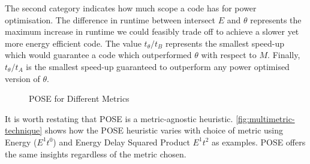 The second category indicates how much scope a code has for power optimisation.
The difference in runtime between intersect $E$ and $\theta$ represents the maximum increase in runtime we could feasibly trade off to achieve a slower yet more energy efficient code.
The value $t_\theta / t_B$ represents the smallest speed-up which would guarantee a code which outperformed $\theta$ with respect to $M$.
Finally, $t_\theta / t_A$ is the smallest speed-up guaranteed to outperform any power optimised version of $\theta$.
\begin{figure}
\centering

\caption{POSE for Different Metrics}
\label{fig:multimetric-technique}
\end{figure}

It is worth restating that POSE is a metric-agnostic heuristic. \autoref{fig:multimetric-technique} shows how the POSE heuristic varies with choice of metric using Energy ($E^1t^0$) and Energy Delay Squared Product $E^1t^2$ as examples. POSE offers the same insights regardless of the metric chosen.

